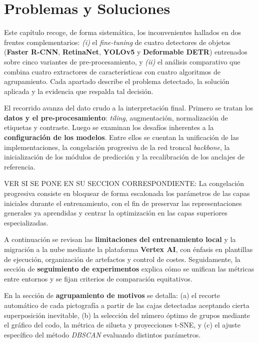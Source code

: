 \chapter{Problemas y Soluciones}\label{ch:problemas_y_soluciones}
\noindent
Este capítulo recoge, de forma sistemática, los inconvenientes hallados en dos frentes complementarios:
\emph{(i)} el \emph{fine-tuning} de cuatro detectores de objetos (\textbf{Faster R-CNN}, \textbf{RetinaNet}, \textbf{YOLOv5} y \textbf{Deformable DETR}) entrenados sobre cinco variantes de pre-procesamiento, y
\emph{(ii)} el análisis comparativo que combina cuatro extractores de características con cuatro algoritmos de agrupamiento.
Cada apartado describe el problema detectado, la solución aplicada y la evidencia que respalda tal decisión.

El recorrido avanza del dato crudo a la interpretación final.
Primero se tratan los \textbf{datos y el pre-procesamiento}: \emph{tiling}, augmentación, normalización de etiquetas y contraste.
Luego se examinan los desafíos inherentes a la \textbf{configuración de los modelos}.
Entre ellos se cuentan la unificación de las implementaciones, la congelación progresiva de la red troncal \emph{backbone}, la inicialización de los módulos de predicción y la recalibración de los anclajes de referencia.

VER SI SE PONE EN SU SECCION CORRESPONDIENTE: La congelación progresiva consiste en bloquear de forma escalonada los parámetros de las capas iniciales durante el entrenamiento, con el fin de preservar las representaciones generales ya aprendidas y centrar la optimización en las capas superiores especializadas.

A continuación se revisan las \textbf{limitaciones del entrenamiento local} y la migración a la nube mediante la plataforma \textbf{Vertex AI}, con énfasis en plantillas de ejecución, organización de artefactos y control de costes.
Seguidamente, la sección de \textbf{seguimiento de experimentos} explica cómo se unifican las métricas entre entornos y se fijan criterios de comparación equitativos.

En la sección de \textbf{agrupamiento de motivos} se detalla:
(a) el recorte automático de cada pictografía a partir de las cajas detectadas aceptando cierta superposición inevitable,
(b) la selección del número óptimo de grupos mediante el gráfico del codo, la métrica de silueta y proyecciones t-SNE,
y (c) el ajuste específico del método \textit{DBSCAN} evaluando distintos parámetros.


